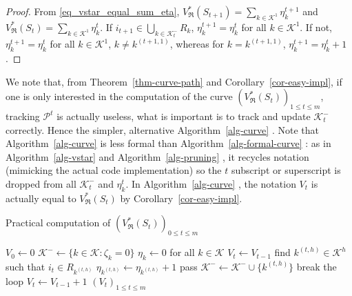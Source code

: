 \documentclass[
  11pt,
  a4paper,
]{article}
\theoremstyle{definition}
\theoremstyle{plain}
\theoremstyle{plain}
\theoremstyle{plain}
\theoremstyle{definition}
\theoremstyle{remark}
\begin{document}
\begin{proof}
From \eqref{eq_vstar_equal_sum_eta},
\(V^*_{\mathfrak{R}}(S_{t+1})=\sum_{k\in\mathcal{K}^1} \eta_k^{t+1}\)
and \(V^*_{\mathfrak{R}}(S_{t})=\sum_{k\in\mathcal{K}^1} \eta_k^{t}\).
If \(i_{t+1}\in \bigcup_{k\in\mathcal{K}^-_t}R_k\),
\(\eta_k^{t+1}=\eta_k^{t}\) for all \(k\in\mathcal{K}^1\). If not,
\(\eta_k^{t+1}=\eta_k^{t}\) for all \(k\in\mathcal{K}^1\),
\(k\neq k^{(t+1,1)}\), whereas for \(k= k^{(t+1,1)}\),
\(\eta_k^{t+1}=\eta_k^{t}+1\).
\end{proof}

We note that, from Theorem~\ref{thm-curve-path} and
Corollary~\ref{cor-easy-impl}, if one is only interested in the
computation of the curve
\(\left(V^*_{\mathfrak{R}}(S_{t})\right)_{1\leq t\leq m}\), tracking
\(\mathcal{P}^t\) is actually useless, what is important is to track and
update \(\mathcal{K}^-_t\) correctly. Hence the simpler, alternative
 Algorithm~\ref{alg-curve} . Note that  Algorithm~\ref{alg-curve}  is
less formal than  Algorithm~\ref{alg-formal-curve} : as in
 Algorithm~\ref{alg-vstar}  and  Algorithm~\ref{alg-pruning} , it
recycles notation (mimicking the actual code implementation) so the
\(t\) subscript or superscript is dropped from all \(\mathcal{K}^-_t\)
and \(\eta_k^t\). In  Algorithm~\ref{alg-curve} , the notation \(V_t\)
is actually equal to \(V^*_{\mathfrak{R}}(S_{t})\) by
Corollary~\ref{cor-easy-impl}.

\begin{algorithm}[htb!]
\caption{Practical computation of $(V^*_{\mathfrak{R}}(S_t))_{0\leq t\leq m}$}
\label{alg-curve}
\begin{algorithmic}[1]
  \State $V_0\gets 0$
  \State $\mathcal{K}^-\gets\{k\in\mathcal{K} : \zeta_k=0  \}$
  \State $\eta_k\gets 0$ for all $k\in\mathcal{K}$
      \State $V_{t}\gets V_{t-1}$
    \Else
        \State find $k^{(t,h)}\in\mathcal{K}^{h}$ such that $i_t\in R_{k^{(t,h)}}$
        \State $\eta_{k^{(t,h)}}\gets\eta_{k^{(t,h)}} + 1$
          \State pass
        \Else
          \State $\mathcal{K}^- \gets \mathcal{K}^-\cup \{ k^{(t,h)} \}$
          \State break the loop
        \EndIf
      \EndFor
     \State $V_{t}\gets V_{t-1} + 1$
    \EndIf
  \EndFor
  \State\Return $(V_t)_{1\leq t \leq m}$
\EndProcedure
\end{algorithmic}
\end{algorithm}
\end{document}
